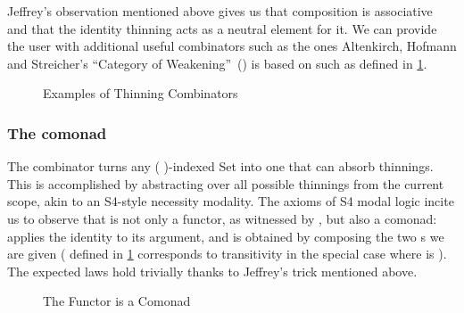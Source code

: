 Jeffrey's observation mentioned above gives us that composition is
associative and that the identity thinning acts as a neutral
element for it. We can provide the user with additional useful
combinators such as the ones Altenkirch, Hofmann and Streicher's
``Category of Weakening''~(\citeyear{altenkirch1995categorical})
is based on such as  defined in \cref{fig:extendth}.

\begin{figure}[h]
\begin{minipage}{0.5\textwidth}
\end{minipage}\begin{minipage}{0.5\textwidth}
\end{minipage}

\caption{Examples of Thinning Combinators\label{fig:extendth}}
\end{figure}

\subsubsection{The  comonad}

The  combinator turns any ( )-indexed Set into
one that can absorb thinnings. This is accomplished by abstracting
over all possible thinnings from the current scope, akin to an
S4-style necessity modality. The axioms of S4 modal logic incite us
to observe that  is not only a functor, as witnessed by
, but also a comonad:  applies
the identity  to its argument, and  is obtained
by composing the two s we are given ( defined in
\cref{fig:extendth} corresponds to transitivity in the special case
where  is ). The expected laws hold trivially thanks
to Jeffrey's trick mentioned above.

\begin{figure}[h]
\begin{minipage}{0.5\textwidth}
\end{minipage}\begin{minipage}{0.5\textwidth}
\end{minipage}

\begin{minipage}{0.5\textwidth}
\end{minipage}\begin{minipage}{0.5\textwidth}
\end{minipage}
\caption{The  Functor is a Comonad}
\end{figure}

